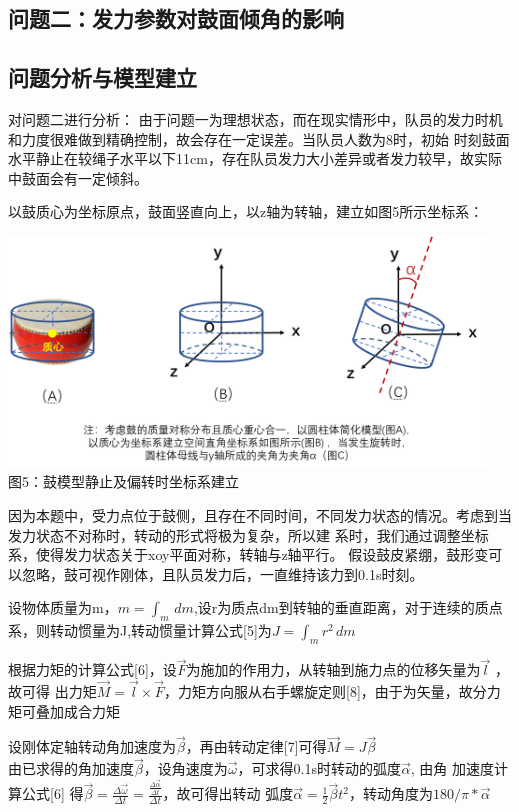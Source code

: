 \documentclass[UTF8]{article}
\begin{document}
\begin{center}
    \section{问题二：发力参数对鼓面倾角的影响}
\end{center}


\subsection{问题分析与模型建立}
对问题二进行分析：
由于问题一为理想状态，而在现实情形中，队员的发力时机和力度很难做到精确控制，故会存在一定误差。当队员人数为8时，初始
时刻鼓面水平静止在较绳子水平以下11cm，存在队员发力大小差异或者发力较早，故实际中鼓面会有一定倾斜。

以鼓质心为坐标原点，鼓面竖直向上，以z轴为转轴，建立如图5所示坐标系：
\begin{center}
    \includegraphics[width=0.95\textwidth]{figure5.png}\\
    图5：鼓模型静止及偏转时坐标系建立
\end{center}

因为本题中，受力点位于鼓侧，且存在不同时间，不同发力状态的情况。考虑到当发力状态不对称时，转动的形式将极为复杂，所以建
系时，我们通过调整坐标系，使得发力状态关于xoy平面对称，转轴与z轴平行。
假设鼓皮紧绷，鼓形变可以忽略，鼓可视作刚体，且队员发力后，一直维持该力到0.1s时刻。

设物体质量为m，$m=\int_{m}\, dm$,设r为质点dm到转轴的垂直距离，对于连续的质点系，则转动惯量为J,转动惯量计算公式[5]为$J=\int_{m} r^2\, dm$

根据力矩的计算公式[6]，设$\overrightarrow{F}$为施加的作用力，从转轴到施力点的位移矢量为$\overrightarrow{l}$ ，故可得
出力矩$\overrightarrow{M}=\overrightarrow{l}\times\overrightarrow{F}$，力矩方向服从右手螺旋定则[8]，由于为矢量，故分力矩可叠加成合力矩

设刚体定轴转动角加速度为$\overrightarrow{\beta}$，再由转动定律[7]可得$\overrightarrow{M}=J\overrightarrow{\beta}$\\
由已求得的角加速度$\overrightarrow{\beta}$，设角速度为$\overrightarrow{\omega}$，可求得0.1s时转动的弧度$\overrightarrow{\alpha}$, 由角
加速度计算公式[6] 得$\overrightarrow{\beta}=\frac{\Delta \overrightarrow{\omega}}{\Delta t}=
\frac{\frac{\Delta \overrightarrow{\alpha}}{\Delta t}}{\Delta t}$，故可得出转动
弧度$\overrightarrow{\alpha}=\frac{1}{2}\overrightarrow{\beta} t^2$，转动角度为$180/\pi*\overrightarrow{\alpha}$\\
\end{document}

